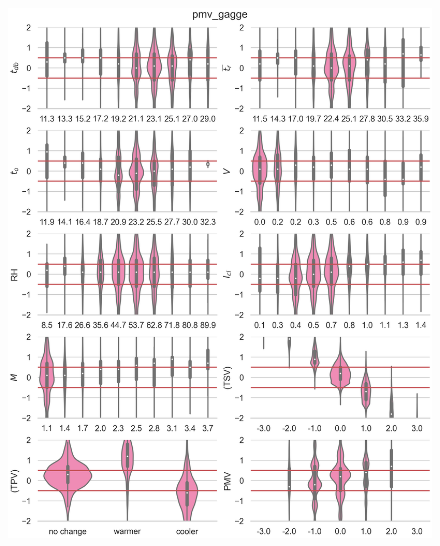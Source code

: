 \begin{figure}
    \centering
    \includegraphics[width=\textwidth]{figures/bias_pmv_gagge}
    \caption{}
    \label{fig:bias_pmv_gagge}
\end{figure}

